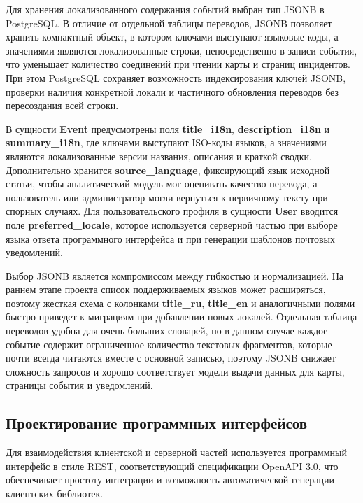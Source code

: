Для хранения локализованного содержания событий выбран тип JSONB в PostgreSQL. В отличие от отдельной таблицы переводов, JSONB позволяет хранить компактный объект, в котором ключами выступают языковые коды, а значениями являются локализованные строки, непосредственно в записи события, что уменьшает количество соединений при чтении карты и страниц инцидентов. При этом PostgreSQL сохраняет возможность индексирования ключей JSONB, проверки наличия конкретной локали и частичного обновления переводов без пересоздания всей строки.

В сущности \textbf{Event} предусмотрены поля \textbf{title\_i18n}, \textbf{description\_i18n} и \textbf{summary\_i18n}, где ключами выступают ISO-коды языков, а значениями являются локализованные версии названия, описания и краткой сводки. Дополнительно хранится \textbf{source\_language}, фиксирующий язык исходной статьи, чтобы аналитический модуль мог оценивать качество перевода, а пользователь или администратор могли вернуться к первичному тексту при спорных случаях. Для пользовательского профиля в сущности \textbf{User} вводится поле \textbf{preferred\_locale}, которое используется серверной частью при выборе языка ответа программного интерфейса и при генерации шаблонов почтовых уведомлений.

Выбор JSONB является компромиссом между гибкостью и нормализацией. На раннем этапе проекта список поддерживаемых языков может расширяться, поэтому жесткая схема с колонками \textbf{title\_ru}, \textbf{title\_en} и аналогичными полями быстро приведет к миграциям при добавлении новых локалей. Отдельная таблица переводов удобна для очень больших словарей, но в данном случае каждое событие содержит ограниченное количество текстовых фрагментов, которые почти всегда читаются вместе с основной записью, поэтому JSONB снижает сложность запросов и хорошо соответствует модели выдачи данных для карты, страницы события и уведомлений.

\subsection{Проектирование программных интерфейсов}

Для взаимодействия клиентской и серверной частей используется программный интерфейс в стиле REST, соответствующий спецификации OpenAPI 3.0, что обеспечивает простоту интеграции и возможность автоматической генерации клиентских библиотек.

